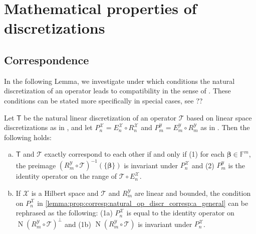 \documentclass[a4paper]{paper}
\newcommand{\Spc}[1]{\mathscr{#1}}
\newcommand{\Field}{\mathbb{F}}
\newcommand{\Op}[1]{\mathcal{#1}}
\newcommand{\DiscOp}[1]{\mathsf{#1}}
\newcommand*{\EXT}[2]{\ensuremath{E_{#1}^{#2}}}
\newcommand*{\REST}[2]{\ensuremath{R_{#1}^{#2}}}
\newcommand*{\PROJ}[2]{\ensuremath{P_{#1}^{#2}}}
\newcommand*{\RnX}{\ensuremath{\REST{n}{\Spc{X}}}}
\newcommand*{\RmY}{\ensuremath{\REST{m}{\Spc{Y}}}}
\newcommand*{\EnX}{\ensuremath{\EXT{n}{\Spc{X}}}}
\newcommand*{\EmY}{\ensuremath{\EXT{m}{\Spc{Y}}}}
\newcommand*{\PnX}{\ensuremath{\PROJ{n}{\Spc{X}}}}
\newcommand*{\PmY}{\ensuremath{\PROJ{m}{\Spc{Y}}}}
\DeclareMathOperator{\nullspace}{N}
\newcommand{\vbeta}{\boldsymbol{\beta}}
\begin{document}
\section{Mathematical properties of discretizations}
\label{sec:prop}



\subsection{Correspondence}
\label{subsec:prop:corresp}

In the following Lemma, we investigate under which conditions the natural discretization of an operator leads to 
compatibility in the sense of . These conditions can be stated more 
specifically in special cases, see ??

\begin{lemma}
 \label{lemma:prop:corresp:natural_op_discr_corresp}
 Let $\DiscOp{T}$ be the natural linear discretization of an operator $\Op{T}$ based on linear space discretizations as 
 in , and let $\PnX = \EnX \circ \RnX$ and $\PmY = \EmY \circ \RmY$ as in 
 . Then the following holds:
 
 \begin{enumerate}[(a)]
  \item \label{lemma:prop:corresp:natural_op_discr_corresp:a_general}
  $\DiscOp{T}$ and $\Op{T}$ exactly correspond to each other if and only if (1) for each $\vbeta \in \Field^m$, the 
  preimage $(\RmY \circ \Op{T})^{-1}(\{\vbeta\})$ is invariant under $\PnX$ and (2) $\PmY$ is the identity operator on 
  the range of $\Op{T} \circ \EnX$.

  \item \label{lemma:prop:corresp:natural_op_discr_corresp:b_hilbert_linear}
  If $\Spc{X}$ is a Hilbert space and $\Op{T}$ and $\RmY$ are linear and bounded, the condition on $\PnX$ in 
  \eqref{lemma:prop:corresp:natural_op_discr_corresp:a_general} can be rephrased as the following: 
  (1a) $\PnX$ is equal to the identity operator on $\nullspace(\RmY \circ \Op{T})^\perp$ and (1b) 
  $\nullspace(\RmY \circ \Op{T})$ is invariant under $\PnX$.
  
 \end{enumerate}
\end{lemma}
\end{document}
